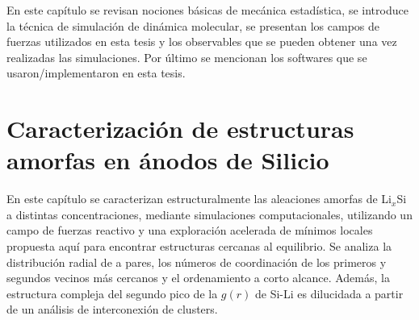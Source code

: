 \documentclass[12pt,spanish,a4paper]{book}
\newcommand\blankpage{%
    \null
    \thispagestyle{empty}%
    \addtocounter{page}{-1}%
    \newpage}
\begin{document}
\vspace{50pt}

\begin{adjustwidth}{50pt}{50pt}
    En este capítulo se revisan nociones básicas de mecánica estadística, se 
    introduce la técnica de simulación de dinámica molecular, se presentan los 
    campos de fuerzas utilizados en esta tesis y los observables que se pueden 
    obtener una vez realizadas las simulaciones. Por último se mencionan los 
    softwares que se usaron/implementaron en esta tesis.
\end{adjustwidth}

\clearpage
\blankpage



\chapter[Estructuras amorfas en ánodos de Silicio]{Caracterización de estructuras
amorfas en ánodos de Silicio}
\thispagestyle{empty}

\vspace{50pt}

\begin{adjustwidth}{50pt}{50pt}
    En este capítulo se caracterizan estructuralmente las aleaciones amorfas de
    Li$_x$Si a distintas concentraciones, mediante simulaciones computacionales,
    utilizando un campo de fuerzas reactivo y una exploración acelerada de mínimos
    locales propuesta aquí para encontrar estructuras cercanas al equilibrio. Se
    analiza la distribución radial de a pares, los números de coordinación de los
    primeros y segundos vecinos más cercanos y el ordenamiento a corto alcance.
    Además, la estructura compleja del segundo pico de la $g(r)$ de Si-Li es 
    dilucidada a partir de un análisis de interconexión de clusters.
\end{adjustwidth}

\clearpage
\blankpage



% 



\end{document}
